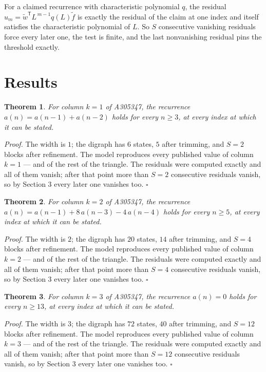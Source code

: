 \documentclass[11pt]{article}
\newtheorem{theorem}{Theorem}
\theoremstyle{definition}
\begin{document}
For a claimed recurrence with characteristic polynomial $q$, the residual $u_m = \tilde w^{\mathsf T}L^{\,m-1}q(L)\tilde f$ is exactly the residual of the claim at one index and itself satisfies the characteristic polynomial of $L$. So $S$ consecutive vanishing residuals force every later one, the test is finite, and the last nonvanishing residual pins the threshold exactly.

\section{Results}

\begin{theorem} For column $k = 1$ of A305347, the recurrence $a(n) = a(n-1) + a(n-2)$ holds for every $n \ge 3$, at every index at which it can be stated.\end{theorem}

{\itshape Proof.} The width is $1$; the digraph has $6$ states, $5$ after trimming, and $S = 2$ blocks after refinement. The model reproduces every published value of column $k = 1$ --- and of the rest of the triangle. The residuals were computed exactly and all of them vanish; after that point more than $S = 2$ consecutive residuals vanish, so by Section 3 every later one vanishes too. $\square$

\begin{theorem} For column $k = 2$ of A305347, the recurrence $a(n) = a(n-1) + 8\,a(n-3) - 4\,a(n-4)$ holds for every $n \ge 5$, at every index at which it can be stated.\end{theorem}

{\itshape Proof.} The width is $2$; the digraph has $20$ states, $14$ after trimming, and $S = 4$ blocks after refinement. The model reproduces every published value of column $k = 2$ --- and of the rest of the triangle. The residuals were computed exactly and all of them vanish; after that point more than $S = 4$ consecutive residuals vanish, so by Section 3 every later one vanishes too. $\square$

\begin{theorem} For column $k = 3$ of A305347, the recurrence $a(n) = 0$ holds for every $n \ge 13$, at every index at which it can be stated.\end{theorem}

{\itshape Proof.} The width is $3$; the digraph has $72$ states, $40$ after trimming, and $S = 12$ blocks after refinement. The model reproduces every published value of column $k = 3$ --- and of the rest of the triangle. The residuals were computed exactly and all of them vanish; after that point more than $S = 12$ consecutive residuals vanish, so by Section 3 every later one vanishes too. $\square$
\end{document}
